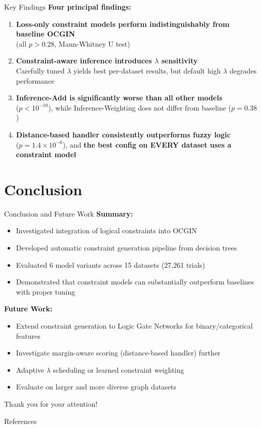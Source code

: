 \documentclass[aspectratio=169]{beamer}
\begin{document}
\begin{frame}{Key Findings}
    \textbf{Four principal findings:}

    \begin{enumerate}
        \item \textbf{Loss-only constraint models perform indistinguishably from baseline OCGIN} \\
        (all $p > 0.28$, Mann-Whitney U test)
        \item \textbf{Constraint-aware inference introduces $\lambda$ sensitivity} \\
        Carefully tuned $\lambda$ yields best per-dataset results, but default high $\lambda$ degrades performance
        \item \textbf{Inference-Add is significantly worse than all other models} \\
        ($p < 10^{-10}$), while Inference-Weighting does not differ from baseline ($p = 0.38$)
        \item \textbf{Distance-based handler consistently outperforms fuzzy logic} \\
        ($p = 1.4 \times 10^{-6}$), and \textbf{the best config on EVERY dataset uses a constraint model}
    \end{enumerate}
\end{frame}

\section{Conclusion}

\begin{frame}{Conclusion and Future Work}
    \textbf{Summary:}
    \begin{itemize}
        \item Investigated integration of logical constraints into OCGIN
        \item Developed automatic constraint generation pipeline from decision trees
        \item Evaluated 6 model variants across 15 datasets (27,261 trials)
        \item Demonstrated that constraint models can substantially outperform baselines with proper tuning
    \end{itemize}

    \textbf{Future Work:}
    \begin{itemize}
        \item Extend constraint generation to Logic Gate Networks for binary/categorical features
        \item Investigate margin-aware scoring (distance-based handler) further
        \item Adaptive $\lambda$ scheduling or learned constraint weighting
        \item Evaluate on larger and more diverse graph datasets
    \end{itemize}
\end{frame}

\begin{frame}{}
    \centering
    \Large Thank you for your attention!
\end{frame}

\begin{frame}[allowframebreaks]{References}
\printbibliography
\end{frame}
\end{document}
